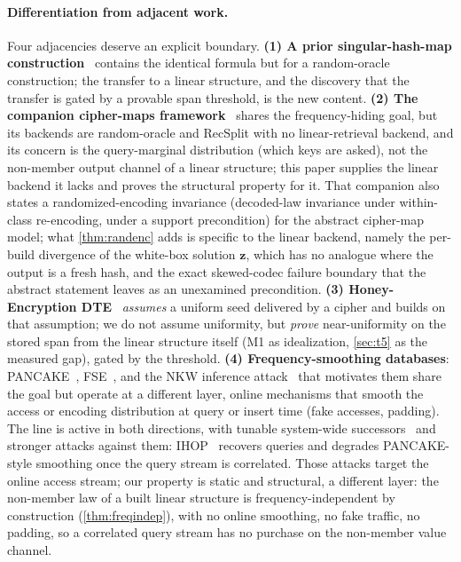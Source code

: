 \documentclass[sigconf,nonacm,anonymous,balance=false]{acmart}
\newcommand{\bz}{\mathbf{z}}                %
\begin{document}
\paragraph{Differentiation from adjacent work.}
Four adjacencies deserve an explicit boundary. \textbf{(1) A prior
singular-hash-map construction}~\cite{towell_bernoulli_maps} contains the identical formula but for a
random-oracle construction; the transfer to a linear structure, and the discovery that the
transfer is gated by a provable span threshold, is the new content. \textbf{(2) The companion
cipher-maps framework}~\cite{towell2026ciphermaps} shares the frequency-hiding goal, but its
backends are random-oracle and RecSplit with no linear-retrieval backend, and its concern is the
query-marginal distribution (which keys are asked), not the non-member output channel of a
linear structure; this paper supplies the linear backend it lacks and proves the structural
property for it. That companion also states a randomized-encoding invariance (decoded-law
invariance under within-class re-encoding, under a support precondition) for the abstract
cipher-map model; what \cref{thm:randenc} adds is specific to the linear backend, namely the
per-build divergence of the white-box solution $\bz$, which has no analogue where the output is
a fresh hash, and the exact skewed-codec failure boundary that the abstract statement leaves as
an unexamined precondition. \textbf{(3) Honey-Encryption DTE}~\cite{juels2014honey,cheng2019pmte}
\emph{assumes} a uniform seed delivered by a cipher and builds on that assumption; we do not
assume uniformity, but \emph{prove} near-uniformity on the stored span from the linear structure
itself (M1 as idealization, \cref{sec:t5} as the measured gap), gated by the threshold.
\textbf{(4) Frequency-smoothing databases}: PANCAKE~\cite{grubbs2020pancake},
FSE~\cite{lacharite2018fse}, and the NKW inference attack~\cite{naveed2015inference} that
motivates them share the goal but operate at a different layer, online mechanisms that smooth the
access or encoding distribution at query or insert time (fake accesses, padding). The line is
active in both directions, with tunable system-wide successors~\cite{zheng2024swat} and stronger
attacks against them: IHOP~\cite{oya2022ihop} recovers queries and degrades PANCAKE-style
smoothing once the query stream is correlated. Those attacks target the online access stream;
our property is static and structural, a different layer: the non-member law of a built linear
structure is frequency-independent by construction (\cref{thm:freqindep}), with no online
smoothing, no fake traffic, no padding, so a correlated query stream has no purchase on the
non-member value channel.
\end{document}
